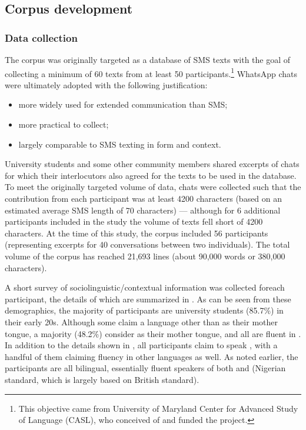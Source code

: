 \documentclass[output=paper,newtxmath,modfonts,nonflat,hidelinks]{langsci/langscibook}
\begin{document}
\subsection{Corpus development}
\subsubsection{Data collection}

The corpus was originally targeted as a database of SMS texts with the goal of collecting a minimum of 60 texts from at least 50 participants.\footnote{This objective came from University of Maryland Center for Advanced Study of Language (CASL), who conceived of and funded the project.} WhatsApp chats were ultimately adopted with the following justification:

\begin{itemize}
\item more widely used for extended communication than SMS; 

\item more practical to collect;

\item largely comparable to SMS texting in form and context.
\end{itemize}

University students and some other community members shared excerpts of chats for which their interlocutors also agreed for the texts to be used in the database. To meet the originally targeted volume of data, chats were collected such that the contribution from each participant was at least 4200 characters (based on an estimated average SMS length of 70 characters) — although for 6 additional participants included in the study the volume of texts fell short of 4200 characters. At the time of this study, the corpus included 56 participants (representing excerpts for 40 conversations between two individuals). The total volume of the corpus has reached 21,693 lines (about 90,000 words or 380,000 characters).

A short survey of sociolinguistic\slash contextual information was collected for\linebreak each participant, the details of which are summarized in . As can be seen from these demographics, the majority of participants are university students (85.7\%) in their early 20s. Although some claim a language other than  as their mother tongue, a majority (48.2\%) consider  as their mother tongue, and all are fluent in . In addition to the details shown in , all participants claim to speak , with a handful of them claiming fluency in other languages as well. As noted earlier, the participants are all bilingual, essentially fluent speakers of both  and  (Nigerian standard, which is largely based on British standard).
\end{document}
